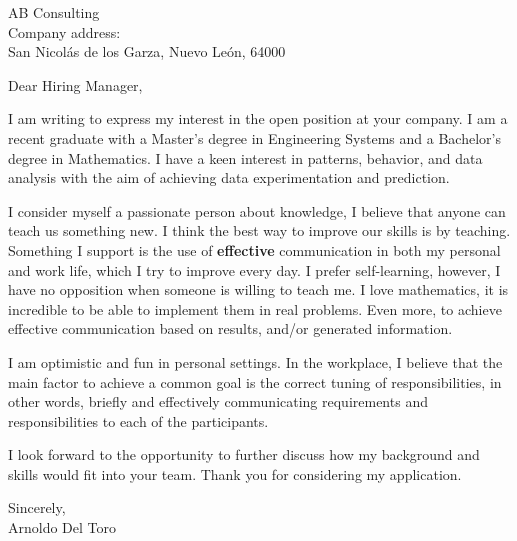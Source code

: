 \documentclass{letter}
\newcommand{\myName}{Arnoldo Del Toro}
\newcommand{\companyname}{AB Consulting}
\newcommand{\companyaddres}{Company address: \\ San Nicolás de los Garza, Nuevo León, 64000}
\begin{document}
\begin{letter}{ \companyname \\ \companyaddres}

\opening{Dear Hiring Manager,}

I am writing to express my interest in the open position at your company. I am a recent graduate with a Master's degree in Engineering Systems and a Bachelor's degree in Mathematics. I have a keen interest in patterns, behavior, and data analysis with the aim of achieving data experimentation and prediction.

I consider myself a passionate person about knowledge, I believe that anyone can teach us something new. I think the best way to improve our skills is by teaching. Something I support is the use of {\bfseries effective} communication in both my personal and work life, which I try to improve every day. I prefer self-learning, however, I have no opposition when someone is willing to teach me. I love mathematics, it is incredible to be able to implement them in real problems. Even more, to achieve effective communication based on results, and/or generated information.

I am optimistic and fun in personal settings. In the workplace, I believe that the main factor to achieve a common goal is the correct tuning of responsibilities, in other words, briefly and effectively communicating requirements and responsibilities to each of the participants.

I look forward to the opportunity to further discuss how my background and skills would fit into your team. Thank you for considering my application.

\closing{Sincerely, \\ \myName}

\end{letter}
\end{document}
